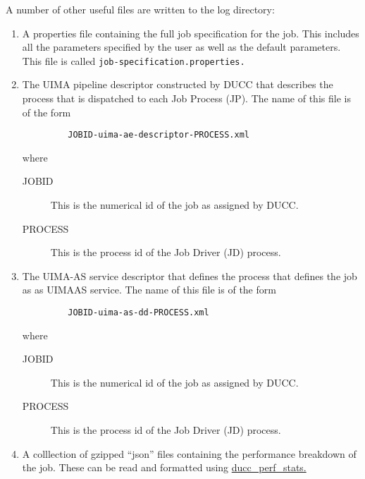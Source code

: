 A number of other useful files are written to the log directory: 
\begin{enumerate}

  \item A properties file containing the full job specification for the job. This includes all the 
    parameters specified by the user as well as the default parameters. This file is called
    {\tt job-specification.properties.}


  \item The UIMA pipeline descriptor constructed by DUCC that describes the process that is 
    dispatched to each Job Process (JP). The name of this file is of the form 

\begin{verbatim}
         JOBID-uima-ae-descriptor-PROCESS.xml 
\end{verbatim}

    where 

    \begin{description}
        \item[JOBID] This is the numerical id of the job as assigned by DUCC.
        \item[PROCESS] This is the process id of the Job Driver (JD) process.
        \end{description}
      
      \item The UIMA-AS service descriptor that defines the process that defines the job as as UIMAAS 
        service. The name of this file is of the form 
\begin{verbatim}
         JOBID-uima-as-dd-PROCESS.xml 
\end{verbatim}
    
        where 
        \begin{description}
            \item[JOBID] This is the numerical id of the job as assigned by DUCC.
            \item[PROCESS] This is the process id of the Job Driver (JD) process.
        \end{description}

      \item A colllection of gzipped ``json'' files containing the performance breakdown of the job.
        These can be read and formatted using \hyperref[sec:cli.ducc-perf-stats]{ducc\_perf\_stats.}
 \end{enumerate}

